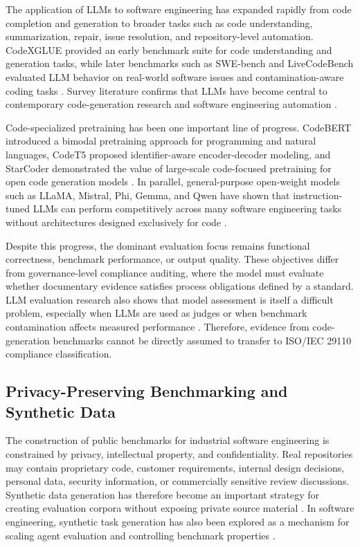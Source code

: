 \documentclass{ieeeaccess}
\begin{document}
The application of LLMs to software engineering has expanded rapidly from code completion and generation to broader tasks such as code understanding, summarization, repair, issue resolution, and repository-level automation. CodeXGLUE provided an early benchmark suite for code understanding and generation tasks, while later benchmarks such as SWE-bench and LiveCodeBench evaluated LLM behavior on real-world software issues and contamination-aware coding tasks \cite{lu2021codexglue,jimenez2023swebench,jain2024livecodebench}. Survey literature confirms that LLMs have become central to contemporary code-generation research and software engineering automation \cite{jiang2024surveycodegen}.

Code-specialized pretraining has been one important line of progress. CodeBERT introduced a bimodal pretraining approach for programming and natural languages, CodeT5 proposed identifier-aware encoder-decoder modeling, and StarCoder demonstrated the value of large-scale code-focused pretraining for open code generation models \cite{feng2020codebert,wang2021codet5,li2023starcoder}. In parallel, general-purpose open-weight models such as LLaMA, Mistral, Phi, Gemma, and Qwen have shown that instruction-tuned LLMs can perform competitively across many software engineering tasks without architectures designed exclusively for code \cite{touvron2023llama,jiang2023mistral,abdin2024phi3,riviere2024gemma2,yang2024qwen25}.

Despite this progress, the dominant evaluation focus remains functional correctness, benchmark performance, or output quality. These objectives differ from governance-level compliance auditing, where the model must evaluate whether documentary evidence satisfies process obligations defined by a standard. LLM evaluation research also shows that model assessment is itself a difficult problem, especially when LLMs are used as judges or when benchmark contamination affects measured performance \cite{asoeollm,cllmrheaesllmis,ICLR2025_7f8f7313,hernandez2024codeduplication,zhou2025lessleak}. Therefore, evidence from code-generation benchmarks cannot be directly assumed to transfer to ISO/IEC 29110 compliance classification.

\subsection{Privacy-Preserving Benchmarking and Synthetic Data}
\label{subsec:rw_privacy_synthetic}

The construction of public benchmarks for industrial software engineering is constrained by privacy, intellectual property, and confidentiality. Real repositories may contain proprietary code, customer requirements, internal design decisions, personal data, security information, or commercially sensitive review discussions. Synthetic data generation has therefore become an important strategy for creating evaluation corpora without exposing private source material \cite{bauer2024syntheticdata}. In software engineering, synthetic task generation has also been explored as a mechanism for scaling agent evaluation and controlling benchmark properties \cite{yang2025swesmith}.
\end{document}
